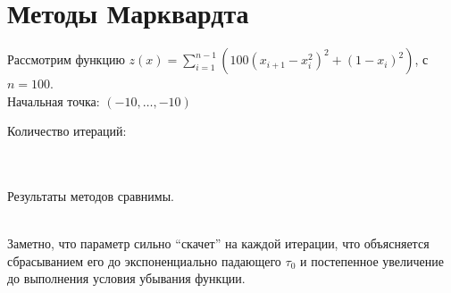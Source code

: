 \documentclass[russian, english]{article}
\begin{document}
\section{Методы Марквардта}
Рассмотрим функцию $z(x)=\sum_{i=1}^{n-1} (100(x_{i+1}-x_i^2)^2+(1-x_i)^2)$, с $n=100$.\\
Начальная точка: $(-10, \dots, -10)$\\
\noindent
\begin{minipage}{\textwidth}
\begin{center}
Количество итераций:\\
\\
\end{center}
\end{minipage}\\
Результаты методов сравнимы.

\begin{center}
\\
Заметно, что параметр сильно ``скачет'' на каждой итерации, что объясняется сбрасыванием его до экспоненциально падающего $\tau_0$ и постепенное увеличение до выполнения условия убывания функции.\\

\end{center}
\end{document}

